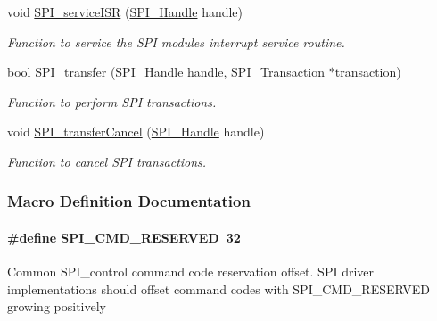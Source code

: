 \begin{DoxyCompactItemize}
void \hyperlink{_s_p_i_8h_aa6f1baa732ebbf0aa7cd5c3f7dfd215a}{S\+P\+I\+\_\+service\+I\+S\+R} (\hyperlink{_s_p_i_8h_a728806534c3c3e8675cfbfb7d8e36f13}{S\+P\+I\+\_\+\+Handle} handle)
\begin{DoxyCompactList}\small\item\em Function to service the S\+P\+I module\textquotesingle{}s interrupt service routine. \end{DoxyCompactList}\item 
bool \hyperlink{_s_p_i_8h_a989e17f96b54fcc3dc2cac5f8ac6bdb2}{S\+P\+I\+\_\+transfer} (\hyperlink{_s_p_i_8h_a728806534c3c3e8675cfbfb7d8e36f13}{S\+P\+I\+\_\+\+Handle} handle, \hyperlink{struct_s_p_i___transaction}{S\+P\+I\+\_\+\+Transaction} $\ast$transaction)
\begin{DoxyCompactList}\small\item\em Function to perform S\+P\+I transactions. \end{DoxyCompactList}\item 
void \hyperlink{_s_p_i_8h_a6819f7761fc3505c4f885653ff8121f0}{S\+P\+I\+\_\+transfer\+Cancel} (\hyperlink{_s_p_i_8h_a728806534c3c3e8675cfbfb7d8e36f13}{S\+P\+I\+\_\+\+Handle} handle)
\begin{DoxyCompactList}\small\item\em Function to cancel S\+P\+I transactions. \end{DoxyCompactList}\end{DoxyCompactItemize}


\subsubsection{Macro Definition Documentation}
\paragraph[{S\+P\+I\+\_\+\+C\+M\+D\+\_\+\+R\+E\+S\+E\+R\+V\+E\+D}]{\setlength{\rightskip}{0pt plus 5cm}\#define S\+P\+I\+\_\+\+C\+M\+D\+\_\+\+R\+E\+S\+E\+R\+V\+E\+D~32}\label{_s_p_i_8h_a3d23d16525ee76f77276472d8dea80b0}
Common S\+P\+I\+\_\+control command code reservation offset. S\+P\+I driver implementations should offset command codes with S\+P\+I\+\_\+\+C\+M\+D\+\_\+\+R\+E\+S\+E\+R\+V\+E\+D growing positively

